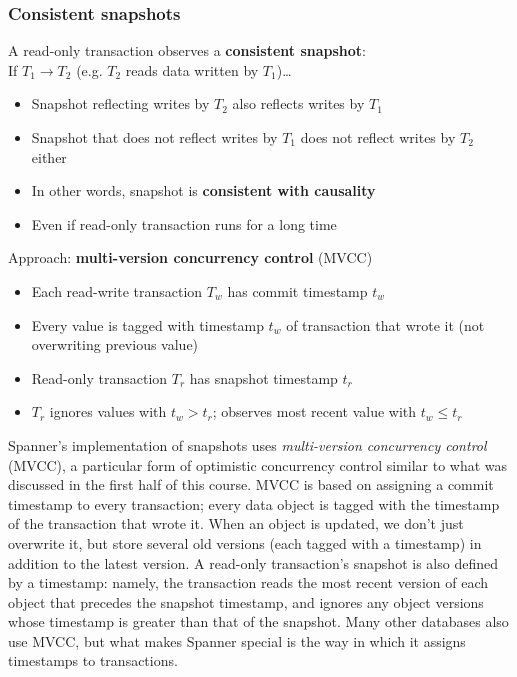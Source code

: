 \begin{frame}
    \label{s:snapshots}
    \frametitle{Consistent snapshots}
    A read-only transaction observes a \textbf{consistent snapshot}:\\
    If $T_1 \rightarrow T_2$ (e.g. $T_2$ reads data written by $T_1$)\dots
    \begin{itemize}
        \item Snapshot reflecting writes by $T_2$ also reflects writes by $T_1$
        \item Snapshot that does not reflect writes by $T_1$ does not reflect writes by $T_2$ either\pause
        \item In other words, snapshot is \textbf{consistent with causality}
        \item Even if read-only transaction runs for a long time\\[1em]\pause
    \end{itemize}
    Approach: \textbf{multi-version concurrency control} (MVCC)
    \begin{itemize}
        \item Each read-write transaction $T_w$ has commit timestamp $t_w$
        \item Every value is tagged with timestamp $t_w$ of transaction that wrote it (not overwriting previous value)\pause
        \item Read-only transaction $T_r$ has snapshot timestamp $t_r$
        \item $T_r$ ignores values with $t_w > t_r$; observes most recent value with $t_w \le t_r$
    \end{itemize}
\end{frame}
\label{l:snapshots}

Spanner's implementation of snapshots uses \emph{multi-version concurrency control} (MVCC), a particular form of optimistic concurrency control similar to what was discussed in the first half of this course.
MVCC is based on assigning a commit timestamp to every transaction; every data object is tagged with the timestamp of the transaction that wrote it.
When an object is updated, we don't just overwrite it, but store several old versions (each tagged with a timestamp) in addition to the latest version.
A read-only transaction's snapshot is also defined by a timestamp: namely, the transaction reads the most recent version of each object that precedes the snapshot timestamp, and ignores any object versions whose timestamp is greater than that of the snapshot.
Many other databases also use MVCC, but what makes Spanner special is the way in which it assigns timestamps to transactions.

